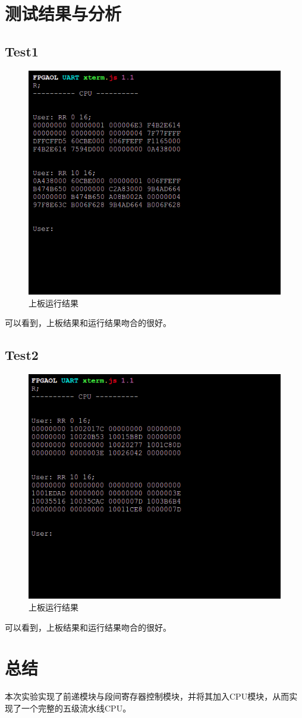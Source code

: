 \documentclass[12pt,a4paper]{ctexart}
\begin{document}
\section{测试结果与分析}
\subsection{Test1}
\begin{figure}[H]
    \centering
    \includegraphics[scale=1]{pic/1_1.png}
    \caption{上板运行结果}
\end{figure}
可以看到，上板结果和运行结果吻合的很好。
\subsection{Test2}
\begin{figure}[H]
    \centering
    \includegraphics[scale=1]{pic/2_1.png}
    \caption{上板运行结果}
\end{figure}
可以看到，上板结果和运行结果吻合的很好。
\section{总结}
本次实验实现了前递模块与段间寄存器控制模块，并将其加入CPU模块，从而实现了一个完整的五级流水线CPU。
\end{document}
